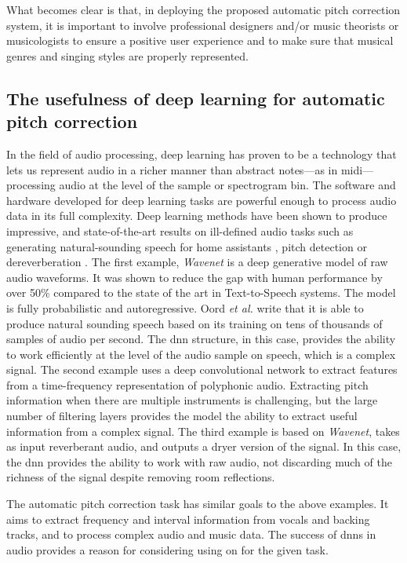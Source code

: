 What becomes clear is that, in deploying the proposed automatic pitch correction system, it is important to involve professional designers and/or music theorists or musicologists to ensure a positive user experience and to make sure that musical genres and singing styles are properly represented.

\subsection{The usefulness of deep learning for automatic pitch correction}
In the field of audio processing, deep learning has proven to be a technology that lets us represent audio in a richer manner than abstract notes---as in \gls{midi}---processing audio at the level of the sample or spectrogram bin. The software and hardware developed for deep learning tasks are powerful enough to process audio data in its full complexity. Deep learning methods have been shown to produce impressive, and state-of-the-art results on ill-defined audio tasks such as generating natural-sounding speech for home assistants \cite{oord2016wavenet}, pitch detection \cite{bittner2017deep} or dereverberation \cite{su2020hifi}. The first example, \textit{Wavenet} is a deep generative model of raw audio waveforms. It was shown to reduce the gap with human performance by over 50\% compared to the state of the art in Text-to-Speech systems. The model is fully probabilistic and autoregressive. Oord \textit{et al.} write that it is able to produce natural sounding speech based on its training on tens of thousands of samples of audio per second. The \gls{dnn} structure, in this case, provides the ability to work efficiently at the level of the audio sample on speech, which is a complex signal. The second example uses a deep convolutional network to extract features from a time-frequency representation of polyphonic audio. Extracting pitch information when there are multiple instruments is challenging, but the large number of filtering layers provides the model the ability to extract useful information from a complex signal. The third example is based on \textit{Wavenet}, takes as input reverberant audio, and outputs a dryer version of the signal. In this case, the \gls{dnn} provides the ability to work with raw audio, not discarding much of the richness of the signal despite removing room reflections.

The automatic pitch correction task has similar goals to the above examples. It aims to extract frequency and interval information from vocals and backing tracks, and to process complex audio and music data. The success of \gls{dnn}s in audio provides a reason for considering using on for the given task.